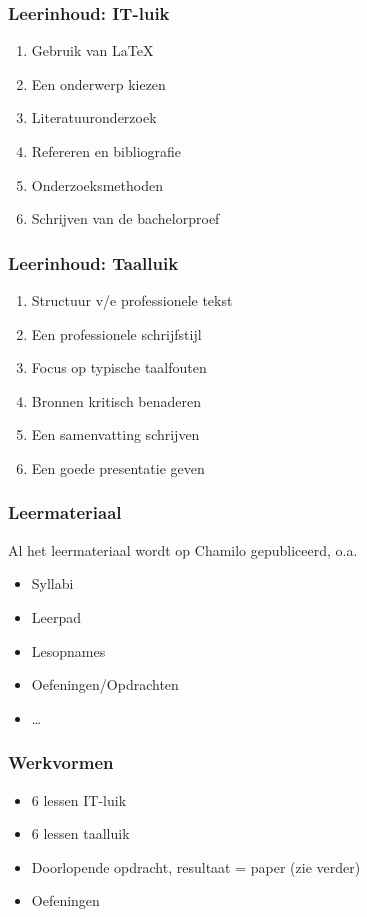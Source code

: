 \documentclass[aspectratio=169]{beamer}
\begin{document}
\begin{frame}
  \frametitle{Leerinhoud: IT-luik}

  \begin{enumerate}
    \item Gebruik van {\LaTeX}
    \item Een onderwerp kiezen
    \item Literatuuronderzoek
    \item Refereren en bibliografie
    \item Onderzoeksmethoden
    \item Schrijven van de bachelorproef
  \end{enumerate}

\end{frame}

\begin{frame}
  \frametitle{Leerinhoud: Taalluik}

  \begin{enumerate}
    \item Structuur v/e professionele tekst
    \item Een professionele schrijfstijl
    \item Focus op typische taalfouten
    \item Bronnen kritisch benaderen
    \item Een samenvatting schrijven
    \item Een goede presentatie geven
  \end{enumerate}

\end{frame}

\begin{frame}
  \frametitle{Leermateriaal}

  Al het leermateriaal wordt op Chamilo gepubliceerd, o.a.

  \begin{itemize}
    \item Syllabi
    \item Leerpad
    \item Lesopnames
    \item Oefeningen/Opdrachten
    \item \ldots
  \end{itemize}

\end{frame}

\begin{frame}
  \frametitle{Werkvormen}

  \begin{itemize}
    \item 6 lessen IT-luik
    \item 6 lessen taalluik
    \item Doorlopende opdracht, resultaat = paper (zie verder)
    \item Oefeningen
  \end{itemize}

\end{frame}
\end{document}
